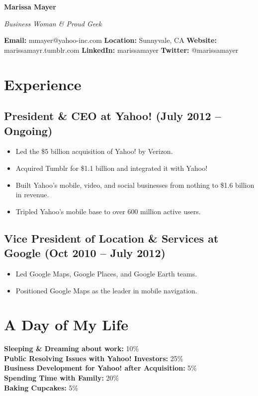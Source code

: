 \documentclass[10pt, a4paper]{article}
\newcommand{\name}[1]{\begin{center} \textbf{\huge #1} \end{center}}
\newcommand{\tagline}[1]{\begin{center} \textit{#1} \end{center}}
\newcommand{\personalinfo}[2]{\noindent \textbf{#1:} #2}
\begin{document}
\name{Marissa Mayer}
\tagline{Business Woman \& Proud Geek}

\personalinfo{Email}{mmayer@yahoo-inc.com}
\personalinfo{Location}{Sunnyvale, CA}
\personalinfo{Website}{marissamayr.tumblr.com}
\personalinfo{LinkedIn}{marissamayer}
\personalinfo{Twitter}{@marissamayer}

\section*{\color{heading}Experience}
\subsection*{President \& CEO at Yahoo! (July 2012 -- Ongoing)}
\begin{itemize}
    \item Led the \$5 billion acquisition of Yahoo! by Verizon.
    \item Acquired Tumblr for \$1.1 billion and integrated it with Yahoo!
    \item Built Yahoo's mobile, video, and social businesses from nothing to \$1.6 billion in revenue.
    \item Tripled Yahoo's mobile base to over 600 million active users.
\end{itemize}

\subsection*{Vice President of Location \& Services at Google (Oct 2010 -- July 2012)}
\begin{itemize}
    \item Led Google Maps, Google Places, and Google Earth teams.
    \item Positioned Google Maps as the leader in mobile navigation.
\end{itemize}

\section*{\color{heading}A Day of My Life}
\begin{center}
\begin{minipage}{0.45\textwidth}
\textbf{Sleeping \& Dreaming about work:} 10\% \\
\textbf{Public Resolving Issues with Yahoo! Investors:} 25\% \\
\textbf{Business Development for Yahoo! after Acquisition:} 5\% \\
\textbf{Spending Time with Family:} 20\% \\
\textbf{Baking Cupcakes:} 5\%
\end{minipage}
\end{center}
\end{document}
